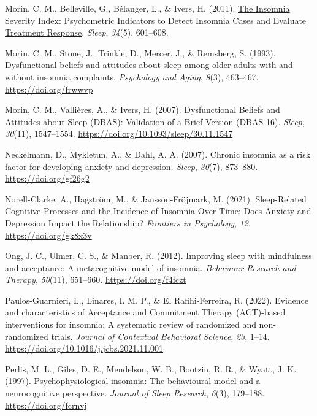 \documentclass[
  ,doc,11pt, twoside,floatsintext]{apa6}
\newlength{\cslhangindent}
\newlength{\cslentryspacingunit} %
\newenvironment{CSLReferences}[2] %
 {%
  \setlength{\parindent}{0pt}
  \ifodd #1
  \let\oldpar\par
  \def\par{\hangindent=\cslhangindent\oldpar}
  \fi
  \setlength{\parskip}{#2\cslentryspacingunit}
 }%
 {}
\begin{document}
\begin{CSLReferences}{1}{0}
\leavevmode{}%
Morin, C. M., Belleville, G., Bélanger, L., \& Ivers, H. (2011). \href{https://www.ncbi.nlm.nih.gov/pmc/articles/PMC3079939}{The {Insomnia Severity Index}: {Psychometric Indicators} to {Detect Insomnia Cases} and {Evaluate Treatment Response}}. \emph{Sleep}, \emph{34}(5), 601--608.

\leavevmode{}%
Morin, C. M., Stone, J., Trinkle, D., Mercer, J., \& Remsberg, S. (1993). Dysfunctional beliefs and attitudes about sleep among older adults with and without insomnia complaints. \emph{Psychology and Aging}, \emph{8}(3), 463--467. \url{https://doi.org/frwwvp}

\leavevmode{}%
Morin, C. M., Vallières, A., \& Ivers, H. (2007). Dysfunctional {Beliefs} and {Attitudes} about {Sleep} ({DBAS}): {Validation} of a {Brief Version} ({DBAS-16}). \emph{Sleep}, \emph{30}(11), 1547--1554. \url{https://doi.org/10.1093/sleep/30.11.1547}

\leavevmode{}%
Neckelmann, D., Mykletun, A., \& Dahl, A. A. (2007). Chronic insomnia as a risk factor for developing anxiety and depression. \emph{Sleep}, \emph{30}(7), 873--880. \url{https://doi.org/gf26g2}

\leavevmode{}%
Norell-Clarke, A., Hagström, M., \& Jansson-Fröjmark, M. (2021). Sleep-{Related Cognitive Processes} and the {Incidence} of {Insomnia Over Time}: {Does Anxiety} and {Depression Impact} the {Relationship}? \emph{Frontiers in Psychology}, \emph{12}. \url{https://doi.org/gk8x3v}

\leavevmode{}%
Ong, J. C., Ulmer, C. S., \& Manber, R. (2012). Improving sleep with mindfulness and acceptance: {A} metacognitive model of insomnia. \emph{Behaviour Research and Therapy}, \emph{50}(11), 651--660. \url{https://doi.org/f4fczt}

\leavevmode{}%
Paulos-Guarnieri, L., Linares, I. M. P., \& El Rafihi-Ferreira, R. (2022). Evidence and characteristics of {Acceptance} and {Commitment Therapy} ({ACT})-based interventions for insomnia: {A} systematic review of randomized and non-randomized trials. \emph{Journal of Contextual Behavioral Science}, \emph{23}, 1--14. \url{https://doi.org/10.1016/j.jcbs.2021.11.001}

\leavevmode{}%
Perlis, M. L., Giles, D. E., Mendelson, W. B., Bootzin, R. R., \& Wyatt, J. K. (1997). Psychophysiological insomnia: The behavioural model and a neurocognitive perspective. \emph{Journal of Sleep Research}, \emph{6}(3), 179--188. \url{https://doi.org/fcrnvj}


\end{CSLReferences}
\end{document}
